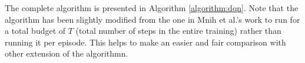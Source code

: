 The complete algorithm is presented in Algorithm \ref{algorithm:dqn}. Note that the algorithm has been slightly modified from the one in Mnih et al.'s work \cite{mnih2013playing, mnih2015human} to run for a total budget of $T$ (total number of steps in the entire training) rather than running it per episode. This helps to make an easier and fair comparison with other extension of the algorithmn.





